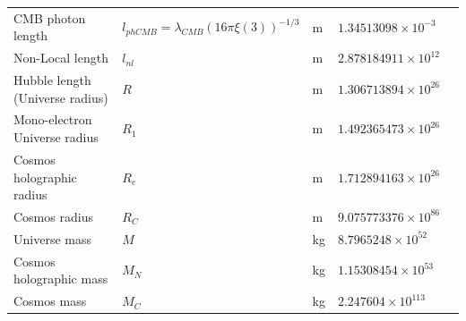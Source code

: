 \documentclass[a4paper,9pt]{article}
\begin{document}
\begin{table}
\begin{tabular}{lllll}
   
   
   CMB photon length & $l_{phCMB} = \lambda_{CMB} (16\pi \xi(3))^{-1/3} $ & m & $1.34513098  \times 10^{-3} $ & \cite{Sanchez2} \\
   
   
   
   Non-Local length & $l_{nl}$ & m & $2.878184911 \times 10^{12} $ & \cite{Sanchez2} \\ 
   
    Hubble length (Universe radius) & $R$ & m & $1.306713894 \times 10^{26} $ & \cite{Sanchez2} \\ 
   Mono-electron Universe radius & $R_1$ & m & $1.492365473 \times 10^{26} $ & \cite{Sanchez2} \\ 
   Cosmos holographic radius & $R_e$ & m & $1.712894163 \times 10^{26} $ & \cite{Sanchez2} \\
   Cosmos radius & $ R_C$ & m & $9.075773376 \times 10^{86} $ & \cite{Sanchez2} \\
   Universe mass & $M$ & kg & $8.7965248 \times 10^{52} $ & \cite{Sanchez2} \\ 
   Cosmos holographic mass & $M_N$ & kg & $1.15308454 \times 10^{53} $ & \cite{Sanchez2} \\
 
   Cosmos mass & $M_C$ & kg & $2.247604 \times 10^{113} $ & \cite{Sanchez2} \\ 
   

    \bottomrule
  \end{tabular}
\end{table}




    
\end{document}
